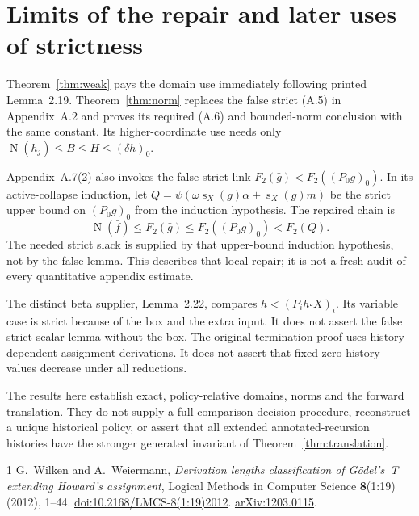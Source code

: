 \documentclass[11pt]{article}
\newcommand{\norm}{\operatorname{N}}
\newcommand{\sz}{\operatorname{s}}
\begin{document}
\section{Limits of the repair and later uses of strictness}

Theorem~\ref{thm:weak} pays the domain use immediately following printed
Lemma~2.19. Theorem~\ref{thm:norm} replaces the false strict (A.5) in
Appendix~A.2 and proves its required (A.6) and bounded-norm conclusion
with the same constant. Its higher-coordinate use needs only
$\norm(h_j)\le B\le H\le(\delta h)_0$.

Appendix~A.7(2) also invokes the false strict link
$F_2(\bar g)<F_2((P_0g)_0)$. In its active-collapse induction, let
$Q=\psi(\omega\sz_X(g)\alpha+\sz_X(g)m)$ be the strict upper bound
on $(P_0g)_0$ from the induction hypothesis. The repaired chain is
\[
 \norm(\bar f)\le F_2(\bar g)
       \le F_2((P_0g)_0)<F_2(Q).
\]
The needed strict slack is supplied by that upper-bound induction
hypothesis, not by the false lemma. This describes that local repair;
it is not a fresh audit of every quantitative appendix estimate.

The distinct beta supplier, Lemma~2.22, compares
$h<(P_i h\square X)_i$. Its variable case is strict because of the
box and the extra input. It does not assert the false strict scalar
lemma without the box. The original termination proof uses
history-dependent assignment derivations. It does not assert that
fixed zero-history values decrease under all reductions.

The results here establish exact, policy-relative domains, norms and
the forward translation. They do not supply a full comparison decision
procedure, reconstruct a unique historical policy, or assert that all
extended annotated-recursion histories have the stronger generated
invariant of Theorem~\ref{thm:translation}.

\begin{thebibliography}{1}
G.~Wilken and A.~Weiermann,
\emph{Derivation lengths classification of G\"odel's~T extending
Howard's assignment},
Logical Methods in Computer Science \textbf{8}(1:19) (2012), 1--44.
\href{https://doi.org/10.2168/LMCS-8(1:19)2012}{doi:10.2168/LMCS-8(1:19)2012}.
\href{https://arxiv.org/abs/1203.0115}{arXiv:1203.0115}.
\end{thebibliography}
\end{document}

